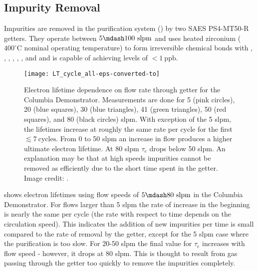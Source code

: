 \subsection{Impurity Removal}
\label{subsec:electron_lifetime_model_removal}
Impurities are removed in the purification system () by two SAES PS4-MT50-R getters.  They operate between
$5 \mdash 100\ \mathrm{slpm}$ and uses heated zirconium ($400^{\circ}\mathrm{C}$ nominal operating temperature) to form irreversible
chemical bonds with , , , , , , and  and is capable of achieving levels of
$< 1\ \mathrm{ppb}$.

\begin{figure}
\centering
\texttt{[image: LT\_cycle\_all-eps-converted-to]}
\caption{Electron lifetime dependence on flow rate through getter for the Columbia Demonstrator.  Measurements are done for 5 (pink
circles), 20 (blue squares), 30 (blue
triangles), 41 (green triangles), 50 (red squares), and 80 (black circles) slpm.  With exception of the 5 slpm, the lifetimes increase
at roughly the same rate per cycle for the first $\lesssim 7\ \mathrm{cycles}$.  From 0 to 50 slpm an increase in flow produces a higher
ultimate electron
lifetime.  At 80 slpm $\tau_e$ drops below 50 slpm.  An explanation may be that at high speeds impurities cannot be removed as
efficiently due to the short time spent in the getter.  Image credit: .}
\label{fig:electron_lifetime_model_removal_demonstrator_circ}
\end{figure}

 shows electron lifetimes using flow speeds of $5 \mdash 80\ \mathrm{slpm}$
in the Columbia Demonstrator.  For flows larger than 5 slpm the rate of increase in the beginning is nearly the same per cycle (the
rate with respect to time depends on the circulation speed).  This indicates the addition of new impurities per time is small
compared to the rate of removal by the getter, except for the 5 slpm case where the purification is too slow.  For 20-50 slpm the final
value for $\tau_e$ increases with flow speed - however, it drops at 80 slpm.  This is thought
to result from gas passing through the getter too quickly to remove the impurities completely.

